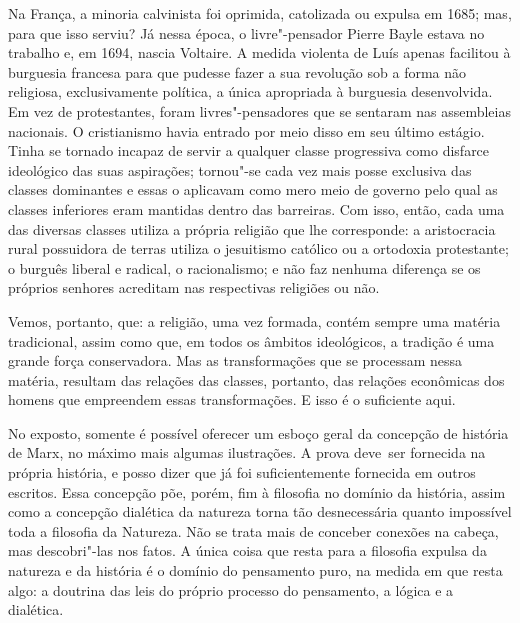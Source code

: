 Na França, a minoria calvinista foi oprimida, catolizada ou expulsa em
1685; mas, para que isso serviu? Já nessa época, o
livre"-pensador Pierre
Bayle estava no trabalho e, em 1694,
nascia Voltaire.
A medida violenta
de Luís  apenas facilitou à burguesia francesa para que pudesse fazer a sua
revolução sob a forma não religiosa, exclusivamente política, a única
apropriada à burguesia desenvolvida. Em vez de protestantes, foram
livres"-pensadores que se sentaram nas assembleias nacionais. O
cristianismo havia entrado por meio disso em seu último estágio. Tinha
se tornado incapaz de servir a qualquer classe progressiva como disfarce
ideológico das suas aspirações; tornou"-se cada vez mais posse exclusiva
das classes dominantes e essas o aplicavam como mero meio de governo
pelo qual as classes inferiores eram mantidas dentro das barreiras. Com
isso, então, cada uma das diversas classes utiliza a própria religião
que lhe corresponde: a aristocracia rural possuidora de 
terras utiliza o jesuitismo católico ou a ortodoxia protestante; o
burguês liberal e radical, o racionalismo; e não faz nenhuma diferença
se os próprios senhores acreditam nas respectivas religiões ou não.

Vemos, portanto, que: a religião, uma vez formada, contém sempre uma
matéria tradicional, assim como que, em todos os âmbitos ideológicos, a
tradição é uma grande força conservadora. Mas as transformações que se
processam nessa matéria, resultam das relações das classes, portanto,
das relações econômicas dos homens que empreendem essas transformações.
E isso é o suficiente aqui.

No exposto, somente é possível oferecer um esboço geral da concepção de
história de Marx, no máximo mais algumas ilustrações. A prova deve\est\ ser
fornecida na própria história, e posso dizer que já foi suficientemente
fornecida em outros escritos. Essa concepção põe, porém, fim à filosofia
no domínio da história, assim como a concepção dialética da natureza
torna tão desnecessária quanto impossível toda a filosofia da Natureza.
Não se trata mais de conceber conexões na cabeça, mas descobri"-las nos
fatos. A única coisa que resta para a filosofia expulsa da natureza e da
história é o domínio do pensamento puro, na medida em que resta algo: a
doutrina das leis do próprio processo do pensamento, a lógica e a
dialética.

\asterisc

